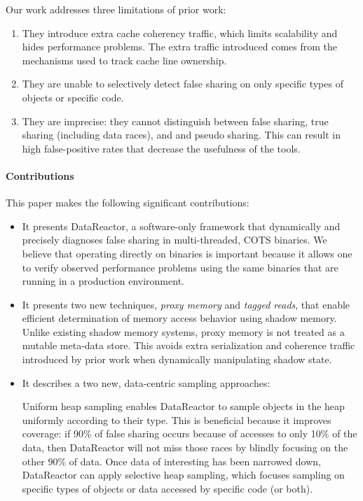 \documentclass{sig-alternate}
\newcommand{\Toolname}{DataReactor}
\begin{document}
Our work addresses three limitations of prior work:
\begin{enumerate}
\item They introduce extra cache coherency traffic, which limits scalability and hides performance
problems. The extra traffic introduced comes from the mechanisms used to track cache line ownership.

\item They are unable to selectively detect false sharing on only specific types of objects or specific
code.

\item They are imprecise: they cannot distinguish between false sharing, true sharing (including
data races), and and pseudo sharing. This can result in high false-positive rates that decrease the
usefulness of the tools.

\end{enumerate}

\paragraph{Contributions}
This paper makes the following significant contributions:
\begin{itemize}
\item It presents \Toolname{}, a software-only framework that dynamically and precisely diagnoses
false sharing  in multi-threaded, COTS binaries. We believe that operating directly on binaries is
important because it allows one to verify observed performance problems using the same binaries
that are running in a production environment.

\item It presents two new techniques, \emph{proxy memory} and \emph{tagged reads}, that enable
efficient determination of memory access behavior using shadow memory. Unlike existing shadow
memory systems, proxy memory is not treated as a mutable meta-data store. This avoids extra
serialization and coherence traffic introduced by prior work when dynamically manipulating shadow state.

\item It describes a two new, data-centric sampling approaches:  Uniform heap sampling enables \Toolname{} to sample objects in the heap uniformly
according to their type. This is beneficial because it improves coverage: if 90\% of false sharing occurs because
of accesses to only 10\% of the data, then \Toolname{} will not miss those races by blindly focusing on the
other 90\% of data. Once data of interesting has been narrowed down, \Toolname{} can apply selective heap
sampling, which focuses sampling on specific types of objects or data accessed by specific code (or both).
\end{itemize}
\end{document}
